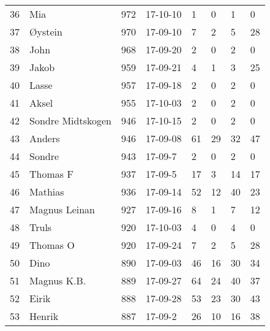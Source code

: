 \begin{longtable}{|r|l|r|l|l|l|l|l|}
36 &                  Mia &   972 &    17-10-10 &               1 &     0 &       1 &         0 \\
37 &              Øystein &   970 &    17-09-10 &               7 &     2 &       5 &        28 \\
38 &                 John &   968 &    17-09-20 &               2 &     0 &       2 &         0 \\
39 &                Jakob &   959 &    17-09-21 &               4 &     1 &       3 &        25 \\
40 &                Lasse &   957 &    17-09-18 &               2 &     0 &       2 &         0 \\
41 &                Aksel &   955 &    17-10-03 &               2 &     0 &       2 &         0 \\
42 &    Sondre Midtskogen &   946 &    17-10-15 &               2 &     0 &       2 &         0 \\
43 &               Anders &   946 &    17-09-08 &              61 &    29 &      32 &        47 \\
44 &               Sondre &   943 &     17-09-7 &               2 &     0 &       2 &         0 \\
45 &             Thomas F &   937 &     17-09-5 &              17 &     3 &      14 &        17 \\
46 &              Mathias &   936 &    17-09-14 &              52 &    12 &      40 &        23 \\
47 &        Magnus Leinan &   927 &    17-09-16 &               8 &     1 &       7 &        12 \\
48 &                Truls &   920 &    17-10-03 &               4 &     0 &       4 &         0 \\
49 &             Thomas O &   920 &    17-09-24 &               7 &     2 &       5 &        28 \\
50 &                 Dino &   890 &    17-09-03 &              46 &    16 &      30 &        34 \\
51 &          Magnus K.B. &   889 &    17-09-27 &              64 &    24 &      40 &        37 \\
52 &                Eirik &   888 &    17-09-28 &              53 &    23 &      30 &        43 \\
53 &               Henrik &   887 &     17-09-2 &              26 &    10 &      16 &        38 \\
\end{longtable}
